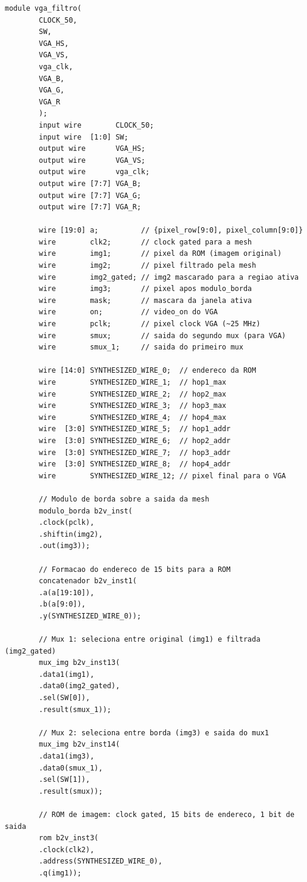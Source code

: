\documentclass[12pt, a4paper]{article}
\begin{document}
	\begin{lstlisting}[style=verilog, caption={\texttt{vga\_filtro.v} --- Módulo \textit{top-level} gerado pelo editor BDF do Quartus Prime, integrando todos os componentes do sistema de filtragem via \textit{mesh}.}, label={lst:top}]
		module vga_filtro(
		CLOCK_50,
		SW,
		VGA_HS,
		VGA_VS,
		vga_clk,
		VGA_B,
		VGA_G,
		VGA_R
		);
		input wire        CLOCK_50;
		input wire  [1:0] SW;
		output wire       VGA_HS;
		output wire       VGA_VS;
		output wire       vga_clk;
		output wire [7:7] VGA_B;
		output wire [7:7] VGA_G;
		output wire [7:7] VGA_R;
		
		wire [19:0] a;          // {pixel_row[9:0], pixel_column[9:0]}
		wire        clk2;       // clock gated para a mesh
		wire        img1;       // pixel da ROM (imagem original)
		wire        img2;       // pixel filtrado pela mesh
		wire        img2_gated; // img2 mascarado para a regiao ativa
		wire        img3;       // pixel apos modulo_borda
		wire        mask;       // mascara da janela ativa
		wire        on;         // video_on do VGA
		wire        pclk;       // pixel clock VGA (~25 MHz)
		wire        smux;       // saida do segundo mux (para VGA)
		wire        smux_1;     // saida do primeiro mux
		
		wire [14:0] SYNTHESIZED_WIRE_0;  // endereco da ROM
		wire        SYNTHESIZED_WIRE_1;  // hop1_max
		wire        SYNTHESIZED_WIRE_2;  // hop2_max
		wire        SYNTHESIZED_WIRE_3;  // hop3_max
		wire        SYNTHESIZED_WIRE_4;  // hop4_max
		wire  [3:0] SYNTHESIZED_WIRE_5;  // hop1_addr
		wire  [3:0] SYNTHESIZED_WIRE_6;  // hop2_addr
		wire  [3:0] SYNTHESIZED_WIRE_7;  // hop3_addr
		wire  [3:0] SYNTHESIZED_WIRE_8;  // hop4_addr
		wire        SYNTHESIZED_WIRE_12; // pixel final para o VGA
		
		// Modulo de borda sobre a saida da mesh
		modulo_borda b2v_inst(
		.clock(pclk),
		.shiftin(img2),
		.out(img3));
		
		// Formacao do endereco de 15 bits para a ROM
		concatenador b2v_inst1(
		.a(a[19:10]),
		.b(a[9:0]),
		.y(SYNTHESIZED_WIRE_0));
		
		// Mux 1: seleciona entre original (img1) e filtrada (img2_gated)
		mux_img b2v_inst13(
		.data1(img1),
		.data0(img2_gated),
		.sel(SW[0]),
		.result(smux_1));
		
		// Mux 2: seleciona entre borda (img3) e saida do mux1
		mux_img b2v_inst14(
		.data1(img3),
		.data0(smux_1),
		.sel(SW[1]),
		.result(smux));
		
		// ROM de imagem: clock gated, 15 bits de endereco, 1 bit de saida
		rom b2v_inst3(
		.clock(clk2),
		.address(SYNTHESIZED_WIRE_0),
		.q(img1));
		

\end{lstlisting}
\end{document}
